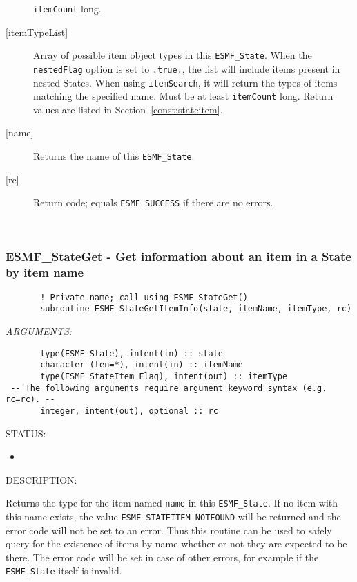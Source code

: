 \begin{description}
   {\tt itemCount} long.
   \item[{[itemTypeList]}]
   Array of possible item object types in this {\tt ESMF\_State}.
   When the {\tt nestedFlag} option is
   set to {\tt .true.}, the list will include items present in nested
   States. When using {\tt itemSearch}, it will return the types of
   items matching the specified name. Must be at least {\tt itemCount}
   long. Return values are listed in Section~\ref{const:stateitem}.
   \item[{[name]}]
   Returns the name of this {\tt ESMF\_State}.
   \item[{[rc]}]
   Return code; equals {\tt ESMF\_SUCCESS} if there are no errors.
   \end{description}
   
 
\mbox{}\hrulefill\ 
 
\subsubsection [ESMF\_StateGet] {ESMF\_StateGet - Get information about an item in a State by item name}


  
\begin{verbatim}       ! Private name; call using ESMF_StateGet()
       subroutine ESMF_StateGetItemInfo(state, itemName, itemType, rc)\end{verbatim}{\em ARGUMENTS:}
\begin{verbatim}       type(ESMF_State), intent(in) :: state
       character (len=*), intent(in) :: itemName
       type(ESMF_StateItem_Flag), intent(out) :: itemType
 -- The following arguments require argument keyword syntax (e.g. rc=rc). --
       integer, intent(out), optional :: rc\end{verbatim}
{\sf STATUS:}
   \begin{itemize}
   \item{}
   \end{itemize}
  
{\sf DESCRIPTION:\\ }


   Returns the type for the item named
   {\tt name} in this {\tt ESMF\_State}. If no item with this name
   exists, the value {\tt ESMF\_STATEITEM\_NOTFOUND} will be returned
   and the error code will not be set to an error. Thus this routine
   can be used to safely query for the existence of items by name
   whether or not they are expected to be there. The error code will
   be set in case of other errors, for example if the {\tt ESMF\_State}
   itself is invalid.
  
